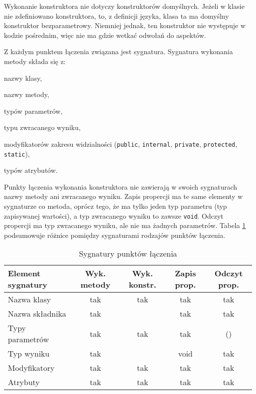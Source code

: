 \documentclass[a4paper,12pt]{mwbk}
\begin{document}
Wykonanie konstruktora nie dotyczy konstruktorów domyślnych. Jeżeli w klasie
nie zdefiniowano konstruktora, to, z definicji języka, klasa ta ma domyślny
konstruktor bezparametrowy.  Niemniej jednak, ten konstruktor nie występuje w
kodzie pośrednim, więc nie ma gdzie wetkać odwołań do aspektów.

Z każdym punktem łączenia związana jest sygnatura. Sygnatura wykonania metody składa się
z: \begin{itemize*}
    \item nazwy klasy,
    \item nazwy metody,
    \item typów parametrów,
    \item typu zwracanego wyniku,
    \item modyfikatorów zakresu widzialności (\lstinline!public!, 
        \lstinline!internal!, \lstinline!private!, \lstinline!protected!, 
        \lstinline!static!),
    \item typów atrybutów.
\end{itemize*}

Punkty łączenia wykonania konstruktora nie zawierają w swoich sygnaturach nazwy
metody ani zwracanego wyniku.  Zapis propercji ma te same elementy w sygnaturze
co metoda, oprócz tego, że ma tylko jeden typ parametru (typ zapisywanej
wartości), a typ zwracanego wyniku to zawsze \lstinline!void!. Odczyt propercji ma typ zwracanego
wyniku, ale nie ma żadnych parametrów. Tabela \ref{sygnatury} podsumowuje
różnice pomiędzy sygnaturami rodzajów punktów łączenia.

\begin{table}
\begin{tabular}{|l|c|c|c|c|}
\hline
Element sygnatury & Wyk. metody & Wyk. konstr. & Zapis prop. & Odczyt prop.\\
\hline
Nazwa klasy     & tak & tak & tak & tak \\\hline
Nazwa składnika & tak &     & tak & tak \\\hline
Typy parametrów & tak & tak & tak & ()  \\\hline
Typ wyniku      & tak &     & void& tak \\\hline
Modyfikatory    & tak & tak & tak & tak \\\hline
Atrybuty        & tak & tak & tak & tak \\\hline
\end{tabular}
\caption{\label{sygnatury}Sygnatury punktów łączenia}
\end{table}
\end{document}
